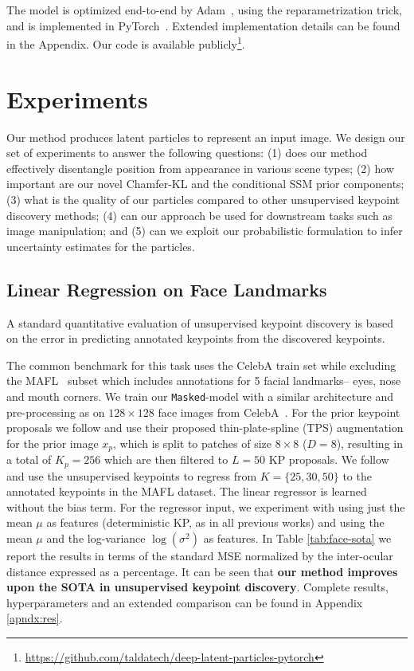 \documentclass[nohyperref]{article}
\theoremstyle{plain}
\theoremstyle{definition}
\theoremstyle{remark}
\begin{document}
The model is optimized end-to-end by Adam~\cite{adam_14}, using the reparametrization trick, and is implemented in PyTorch~\citep{paszke2017automatic}. Extended implementation details can be found in the Appendix. Our code is available publicly\footnote{\url{https://github.com/taldatech/deep-latent-particles-pytorch}}.




\section{Experiments}
\label{sec:exp}
Our method produces latent particles to represent an input image. We design our set of experiments to answer the following questions: (1) does our method effectively disentangle position from appearance in various scene types; (2) how important are our novel Chamfer-KL and the conditional SSM prior components;
(3) what is the quality of our particles compared to other unsupervised keypoint discovery methods; 
(4) can our approach be used for downstream tasks such as image manipulation; and (5) can we exploit our probabilistic formulation to infer uncertainty estimates for the particles.


\subsection{Linear Regression on Face Landmarks}
\label{subsec:supervised_kp}
A standard quantitative evaluation of unsupervised keypoint discovery is based on the error in predicting annotated keypoints from the discovered keypoints. 

The common benchmark for this task uses the CelebA train set while excluding the MAFL~\citep{zhang2014facial} subset which includes annotations for 5 facial landmarks-- eyes, nose and mouth corners.
We train our \texttt{Masked}-model with a similar architecture and pre-processing as \citet{jakab2018unsupervised} on $128\times 128$ face images from CelebA~\citep{liu2015faceattributes}. For the prior keypoint proposals we follow \citet{jakab2018unsupervised} and use their proposed thin-plate-spline (TPS) augmentation for the prior image $x_p$, which is split to patches of size $8\times 8$ ($D=8$), resulting in a total of $K_p=256$ which are then filtered to $ L=50$ KP proposals. We follow \citet{thewlis2017unsupervised1, thewlis2017unsupervised2, jakab2018unsupervised} and use the unsupervised keypoints to regress from $K= \{25, 30, 50 \}$ to the annotated keypoints in the MAFL dataset. The linear regressor is learned without the bias term. For the regressor input, we experiment with using just the mean $\mu$ as features (deterministic KP, as in all previous works) and using the mean $\mu$ and the log-variance $\log(\sigma^2)$ as features. In Table \ref{tab:face-sota} we report the results in terms of the standard MSE normalized by the inter-ocular distance expressed as a percentage. It can be seen that \textbf{our method improves upon the SOTA in unsupervised keypoint discovery}.
Complete results, hyperparameters and an extended comparison can be found in Appendix \ref{apndx:res}.
\end{document}
